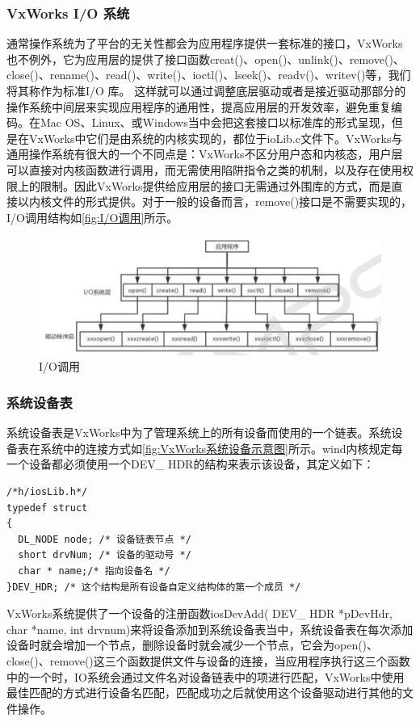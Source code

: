 \subsubsection{VxWorks I/O 系统}
	通常操作系统为了平台的无关性都会为应用程序提供一套标准的接口，VxWorks也不例外，它为应用层的提供了接口函数creat()、open()、unlink()、remove()、close()、rename()、read()、write()、ioctl()、lseek()、readv()、writev()等\cite{陈洋2007VxWorks}\cite{Wu2008Implementation}\cite{Zhang2010Design}，我们将其称作为标准I/O 库。
	这样就可以通过调整底层驱动或者是接近驱动那部分的操作系统中间层来实现应用程序的通用性，提高应用层的开发效率，避免重复编码。在Mac OS、Linux、或Windows当中会把这套接口以标准库的形式呈现，但是在VxWorks中它们是由系统的内核实现的，都位于ioLib.c文件下。VxWorks与通用操作系统有很大的一个不同点是：VxWorks不区分用户态和内核态，用户层可以直接对内核函数进行调用，而无需使用陷阱指令之类的机制，以及存在使用权限上的限制。因此VxWorks提供给应用层的接口无需通过外围库的方式，而是直接以内核文件的形式提供\cite{VxWorks内核解读}。对于一般的设备而言，remove()接口是不需要实现的，I/O调用结构如\autoref{fig:I/O调用}所示。
	\begin{figure}[!h]
\centering
\includegraphics[width=1.0\textwidth]{./graphics/IOCall.pdf}
\caption{I/O调用}\label{fig:I/O调用}
\end{figure}

	
\subsubsection{系统设备表}
	系统设备表是VxWorks中为了管理系统上的所有设备而使用的一个链表。系统设备表在系统中的连接方式如\autoref{fig:VxWorks系统设备示意图}所示。wind内核规定每一个设备都必须使用一个DEV\_ HDR的结构来表示该设备，其定义如下\cite{VxWorks内核解读}：
\lstset{language=C}
\begin{lstlisting}
/*h/iosLib.h*/
typedef struct
{ 
  DL_NODE node; /* 设备链表节点 */ 
  short drvNum; /* 设备的驱动号 */ 
  char * name;/* 指向设备名 */ 
}DEV_HDR; /* 这个结构是所有设备自定义结构体的第一个成员 */
\end{lstlisting}
VxWorks系统提供了一个设备的注册函数iosDevAdd( DEV\_ HDR *pDevHdr, char *name, int drvnum)来将设备添加到系统设备表当中，系统设备表在每次添加设备时就会增加一个节点，删除设备时就会减少一个节点，它会为open()、close()、remove()这三个函数提供文件与设备的连接，当应用程序执行这三个函数中的一个时，IO系统会通过文件名对设备链表中的项进行匹配\cite{刘小军2008基于}，VxWorks中使用最佳匹配的方式进行设备名匹配，匹配成功之后就使用这个设备驱动进行其他的文件操作。


